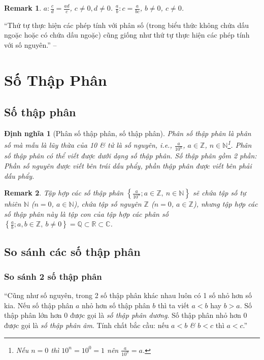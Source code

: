 \documentclass[oneside]{book}
\numberwithin{equation}{section}
\newtheorem{dinhnghia}{Định nghĩa}[section]
\newtheorem{remark}{Remark}[section]
\begin{document}
\begin{remark}
	$a:\frac{c}{d} = \frac{ad}{c}$, $c\ne 0,d\ne 0$. $\frac{a}{b}:c = \frac{a}{bc}$, $b\ne 0$, $c\ne 0$.
\end{remark}
``Thứ tự thực hiện các phép tính với phân số (trong biểu thức không chứa dấu ngoặc hoặc có chứa dấu ngoặc) cũng giống như thứ tự thực hiện các phép tính với số nguyên.'' -- \cite[p. 42]{Thai_Anh_Dat_Ha_Loan_Nam_Quang_Toan_6_tap_2}


\section{Số Thập Phân}

\subsection{Số thập phân}

\begin{dinhnghia}[Phân số thập phân, số thập phân]
	\emph{Phân số thập phân} là phân số mà mẫu là lũy thừa của 10 \textit{\&} tử là số nguyên, i.e., $\frac{a}{10^n}$, $a\in\mathbb{Z}$, $n\in\mathbb{N}$\footnote{Nếu $n = 0$ thì $10^n = 10^0 = 1$ nên $\frac{a}{10^n} = a$.}. Phân số thập phân có thể viết được dưới dạng số thập phân. Số thập phân gồm 2 phần: \emph{Phần số nguyên} được viết bên trái dấu phẩy, \emph{phần thập phân} được viết bên phải dấu phẩy.
\end{dinhnghia}

\begin{remark}
	Tập hợp các số thập phân $\left\{\frac{a}{10^n};a\in\mathbb{Z},\ n\in\mathbb{N}\right\}$ sẽ chứa tập số tự nhiên $\mathbb{N}$ ($n = 0$, $a\in\mathbb{N}$), chứa tập số nguyên $\mathbb{Z}$ ($n = 0$, $a\in\mathbb{Z}$), nhưng tập hợp các số thập phân này là tập con của tập hợp các phân số $\left\{\frac{a}{b};a,b\in\mathbb{Z},\ b\ne 0\right\} = \mathbb{Q}\subset\mathbb{R}\subset\mathbb{C}$.
\end{remark}

\subsection{So sánh các số thập phân}

\subsubsection{So sánh 2 số thập phân}
``Cũng như số nguyên, trong 2 số thập phân khác nhau luôn có 1 số nhỏ hơn số kia. Nếu số thập phân $a$ nhỏ hơn số thập phân $b$ thì ta viết $a < b$ hay $b > a$. Số thập phân lớn hơn 0 được gọi là \emph{số thập phân dương}. Số thập phân nhỏ hơn 0 được gọi là \emph{số thập phân âm}. Tính chất bắc cầu: nếu $a < b$ \textit{\&} $b < c$ thì $a < c$.'' \cite[p. 45]{Thai_Anh_Dat_Ha_Loan_Nam_Quang_Toan_6_tap_2}
\end{document}
